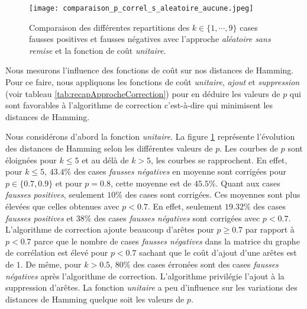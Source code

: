 \begin{figure}[htb!] 
\centering
\texttt{[image: comparaison\_p\_correl\_s\_aleatoire\_aucune.jpeg]}
\caption{ Comparaison des diff\'erentes repartitions des $k \in \{1,\cdots,9\}$ cases fausses positives et fausses n\'egatives avec l'approche {\em al\'eatoire sans remise} et la fonction de co\^ut {\em unitaire}. }
\label{comparaison_p_correl_s_aleatoire_aucune} 
\end{figure}


Nous mesurons l'influence des fonctions de co\^ut sur nos distances de Hamming.
Pour ce faire, nous appliquons les fonctions de co\^ut {\em unitaire}, {\em ajout} et {\em suppression} (voir tableau \ref{tab:recapApprocheCorrection}) pour en d\'eduire les valeurs de $p$ qui sont favorables \`a l'algorithme de correction c'est-\`a-dire qui minimisent les distances de Hamming.
\newline

Nous consid\'erons d'abord la fonction {\em unitaire}.
La figure \ref{comparaison_p_correl_s_aleatoire_aucune} repr\'esente l'\'evolution des distances de Hamming selon les diff\'erentes valeurs de $p$.  Les courbes de $p$ sont \'eloign\'ees pour $k \le 5$ et au d\'el\`a de  $k > 5$, les courbes se rapprochent. 
En effet, 
pour $k \le 5$, $43.4\%$ des cases {\em fausses n\'egatives} en moyenne sont corrig\'ees pour $p\in \{0.7, 0.9\}$ et pour $p=0.8$, cette moyenne est de $45.5\%$. Quant aux cases {\em fausses positives}, seulement $10\%$ des cases sont corrig\'ees. 
Ces moyennes sont plus \'elev\'ees que celles obtenues avec $p<0.7$.  
En effet, seulement $19.32\%$ des cases {\em fausses positives} et $38\%$ des cases  {\em fausses n\'egatives} sont corrig\'ees avec  $p<0.7$. 
 L'algorithme de correction ajoute beaucoup d'ar\^etes pour $p \ge 0.7$ par rapport \`a $p<0.7$ parce que le nombre de cases {\em fausses n\'egatives} dans la matrice du graphe de corr\'elation est \'elev\'e pour $p<0.7$ sachant que le co\^ut d'ajout  d'une ar\^etes est de $1$.
\newline
De m\^eme, pour $k > 0.5$, $80\%$ des cases \'erron\'ees sont des cases {\em fausses n\'egatives} apr\`es l'algorithme de correction.  L'algorithme privil\'egie l'ajout  \`a la suppression d'ar\^etes. 
\newline
La fonction {\em unitaire} a peu d'influence sur les variations des distances de Hamming quelque soit les valeurs de $p$.  

